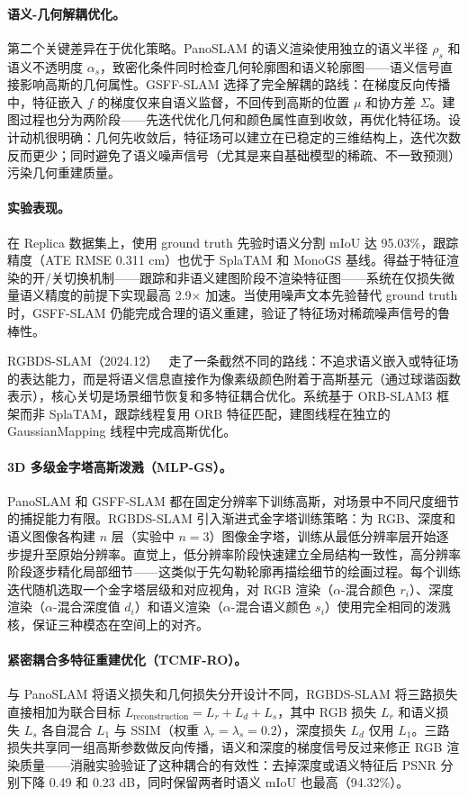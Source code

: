 \paragraph{语义-几何解耦优化。}
第二个关键差异在于优化策略。PanoSLAM 的语义渲染使用独立的语义半径 $\rho_s$ 和语义不透明度 $\alpha_s$，致密化条件同时检查几何轮廓图和语义轮廓图——语义信号直接影响高斯的几何属性。GSFF-SLAM 选择了完全解耦的路线：在梯度反向传播中，特征嵌入 $f$ 的梯度仅来自语义监督，不回传到高斯的位置 $\mu$ 和协方差 $\Sigma$。建图过程也分为两阶段——先迭代优化几何和颜色属性直到收敛，再优化特征场。设计动机很明确：几何先收敛后，特征场可以建立在已稳定的三维结构上，迭代次数反而更少；同时避免了语义噪声信号（尤其是来自基础模型的稀疏、不一致预测）污染几何重建质量。

\paragraph{实验表现。}
在 Replica 数据集上，使用 ground truth 先验时语义分割 mIoU 达 95.03\%，跟踪精度（ATE RMSE 0.311 cm）也优于 SplaTAM 和 MonoGS 基线。得益于特征渲染的开/关切换机制——跟踪和非语义建图阶段不渲染特征图——系统在仅损失微量语义精度的前提下实现最高 2.9$\times$ 加速。当使用噪声文本先验替代 ground truth 时，GSFF-SLAM 仍能完成合理的语义重建，验证了特征场对稀疏噪声信号的鲁棒性。

RGBDS-SLAM（2024.12）~\cite{2412_01217} 走了一条截然不同的路线：不追求语义嵌入或特征场的表达能力，而是将语义信息直接作为像素级颜色附着于高斯基元（通过球谐函数表示），核心关切是场景细节恢复和多特征耦合优化。系统基于 ORB-SLAM3 框架而非 SplaTAM，跟踪线程复用 ORB 特征匹配，建图线程在独立的 GaussianMapping 线程中完成高斯优化。

\paragraph{3D 多级金字塔高斯泼溅（MLP-GS）。}
PanoSLAM 和 GSFF-SLAM 都在固定分辨率下训练高斯，对场景中不同尺度细节的捕捉能力有限。RGBDS-SLAM 引入渐进式金字塔训练策略：为 RGB、深度和语义图像各构建 $n$ 层（实验中 $n{=}3$）图像金字塔，训练从最低分辨率层开始逐步提升至原始分辨率。直觉上，低分辨率阶段快速建立全局结构一致性，高分辨率阶段逐步精化局部细节——这类似于先勾勒轮廓再描绘细节的绘画过程。每个训练迭代随机选取一个金字塔层级和对应视角，对 RGB 渲染（$\alpha$-混合颜色 $r_i$）、深度渲染（$\alpha$-混合深度值 $d_i$）和语义渲染（$\alpha$-混合语义颜色 $s_i$）使用完全相同的泼溅核，保证三种模态在空间上的对齐。

\paragraph{紧密耦合多特征重建优化（TCMF-RO）。}
与 PanoSLAM 将语义损失和几何损失分开设计不同，RGBDS-SLAM 将三路损失直接相加为联合目标 $L_{\mathrm{reconstruction}} = L_r + L_d + L_s$，其中 RGB 损失 $L_r$ 和语义损失 $L_s$ 各自混合 $L_1$ 与 SSIM（权重 $\lambda_r{=}\lambda_s{=}0.2$），深度损失 $L_d$ 仅用 $L_1$。三路损失共享同一组高斯参数做反向传播，语义和深度的梯度信号反过来修正 RGB 渲染质量——消融实验验证了这种耦合的有效性：去掉深度或语义特征后 PSNR 分别下降 0.49 和 0.23 dB，同时保留两者时语义 mIoU 也最高（94.32\%）。

